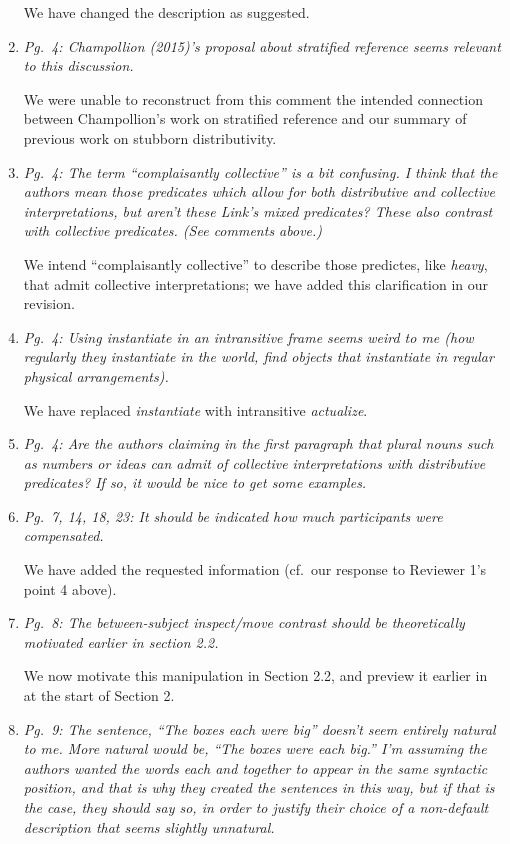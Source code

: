 \documentclass[12pt]{article}
\begin{document}
\begin{enumerate}
We have changed the description as suggested.
	
\item \emph{Pg.~4: Champollion (2015)'s proposal about stratified reference seems relevant to this discussion.}

We were unable to reconstruct from this comment the intended connection between Champollion's work on stratified reference and our summary of previous work on stubborn distributivity.

\item \emph{Pg.~4: The term ``complaisantly collective'' is a bit confusing. I think that the authors mean those predicates which allow for both distributive and collective interpretations, but aren't these Link's mixed predicates? These also contrast with collective predicates. (See comments above.)}

We intend ``complaisantly collective'' to describe those predictes, like \emph{heavy}, that admit collective interpretations; we have added this clarification in our revision.

\item \emph{Pg.~4: Using \emph{instantiate} in an intransitive frame seems weird to me (\emph{how regularly they instantiate in the world}, \emph{find objects that instantiate in regular physical arrangements}).}

We have replaced \emph{instantiate} with intransitive \emph{actualize}.
	
\item \emph{Pg.~4: Are the authors claiming in the first paragraph that plural nouns such as \emph{numbers} or \emph{ideas} can admit of collective interpretations with distributive predicates? If so, it would be nice to get some examples.}

\item \emph{Pg.~7, 14, 18, 23: It should be indicated how much participants were compensated.}

We have added the requested information (cf.~our response to Reviewer 1's point 4 above).

\item \emph{Pg.~8: The between-subject inspect/move contrast should be theoretically motivated earlier in section 2.2.}

We now motivate this manipulation in Section 2.2, and preview it earlier in at the start of Section 2.

\item \emph{Pg.~9: The sentence, ``The boxes each were big'' doesn't seem entirely natural to me. More natural would be, ``The boxes were each big.'' I'm assuming the authors wanted the words each and together to appear in the same syntactic position, and that is why they created the sentences in this way, but if that is the case, they should say so, in order to justify their choice of a non-default description that seems slightly unnatural.}


\end{enumerate}
\end{document}
